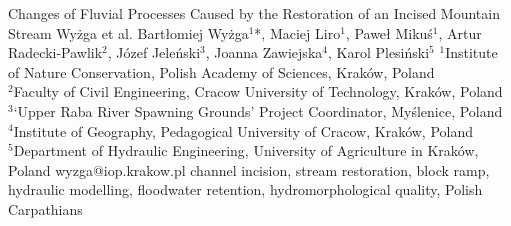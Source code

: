 \abstract
{Changes of Fluvial Processes Caused by the Restoration of
	an Incised Mountain Stream
} %
{Wyżga et al.} %
{Bartłomiej Wyżga$^1$*, Maciej Liro$^1$, Paweł Mikuś$^1$, Artur Radecki-Pawlik$^2$, Józef Jeleński$^3$, Joanna Zawiejska$^4$, Karol Plesiński$^5$} %
{\KLtag} %
{$^1$Institute of Nature Conservation, Polish Academy of Sciences, Kraków, Poland\\
	$^2$Faculty of Civil Engineering, Cracow University of Technology, Kraków, Poland\\
	$^3$‘Upper Raba River Spawning Grounds’ Project Coordinator, Myślenice, Poland\\
	$^4$Institute of Geography, Pedagogical University of Cracow, Kraków, Poland\\
	$^5$Department of Hydraulic Engineering, University of Agriculture in Kraków, Poland
} %
{wyzga@iop.krakow.pl}  %
{channel incision, stream restoration, block ramp, hydraulic modelling, floodwater retention, hydromorphological quality, Polish Carpathians}%
